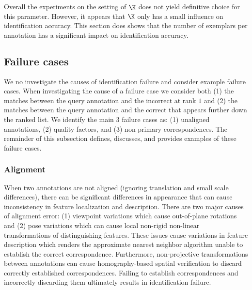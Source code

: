 
        Overall the experiments on the setting of $\K$ does not yield definitive choice for this parameter.
        However, it appears that $\K$ only has a small influence on identification accuracy.
        This section does shows that the number of exemplars per annotation has a significant impact on
          identification accuracy.

        \KExptA{}
        \KExptB{}

    \FloatBarrier{}
    \subsection{Failure cases}\label{sub:exptfail}  
        
        We no investigate the causes of identification failure and consider example failure cases.
        When investigating the cause of a failure case we consider both
        (1) the matches between the query annotation and the incorrect \name{}  at rank $1$ and
        (2) the matches between the query annotation and the correct \name{} that appears further down the ranked
          list.
        We identify the main 3 failure cases as:
        (1) unaligned annotations,
        (2) quality factors, and
        (3) non-primary correspondences.
        The remainder of this subsection defines, discusses, and provides examples of these failure cases.


        \FloatBarrier{}
        \subsubsection{Alignment}
            
            When two annotations are not aligned (ignoring translation and small scale differences), there can be
              significant differences in appearance that can cause inconsistency in feature localization and
              description.
            There are two major causes of alignment error:
            (1) viewpoint variations which cause out-of-plane rotations and
            (2) pose variations which can cause local non-rigid non-linear transformations of distinguishing
              features.
            These issues cause variations in feature description which renders the approximate nearest neighbor
              algorithm unable to establish the correct correspondence.
            Furthermore, non-projective transformations between annotations can cause homography-based spatial
              verification to discard correctly established correspondences.
            Failing to establish correspondences and incorrectly discarding them ultimately results in
              identification failure.

